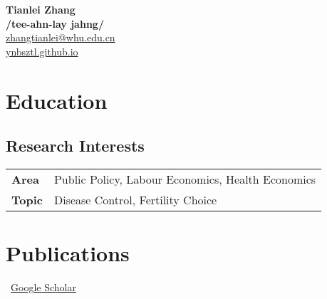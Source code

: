 \documentclass[11pt]{article} %
\newcommand{\mytitle}[4]{
  \begin{center}
    \Large\textbf{#1}\normalsize \\ %
    \href{mailto:#2}{#2} \\ %
    \href{https://#3}{#3} \\ %
    #4 %
  \end{center}
}
\begin{document}
\mytitle{Tianlei Zhang \\ \normalsize{\textnormal{/tee-ahn-lay jahng/}}}{zhangtianlei@whu.edu.cn}{ynbsztl.github.io} %


\RaggedRight


\section*{Education}


%

\subsection*{Research Interests}\label{ri}

\begin{longtable}[l]{@{}p{} p{}}

    \textbf{Area} & Public Policy, Labour Economics, Health Economics \\
    \textbf{Topic} & Disease Control, Fertility Choice  \\
    
\end{longtable}

\section*{Publications}
\label{pubs}

\vspace{-.75em}
\small
\faGoogle~\href{https://scholar.google.com/citations?hl=zh-CN&user=zsO6zkYAAAAJ}{Google Scholar}\\
\normalsize


\end{document}
